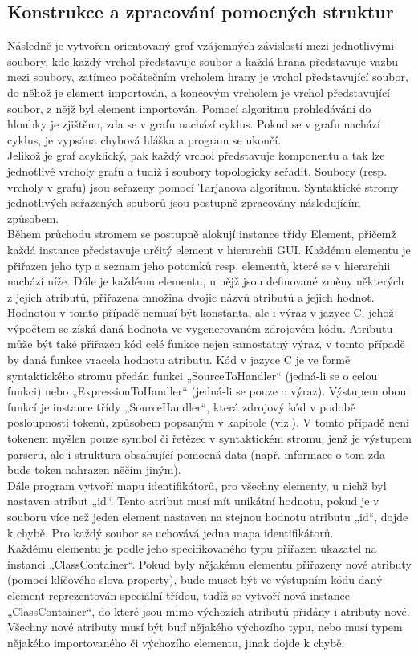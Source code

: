 \documentclass[report,11pt]{elsarticle}
\begin{document}
\subsection{\label{SEC:Intro}Konstrukce a zpracování pomocných struktur}
Následně je vytvořen orientovaný graf vzájemných závislostí mezi jednotlivými soubory, kde každý vrchol představuje soubor a každá hrana představuje vazbu mezi soubory, zatímco počátečním vrcholem hrany je vrchol představující soubor, do něhož je element importován, a koncovým vrcholem je vrchol představující soubor, z nějž byl element importován. Pomocí algoritmu prohledávání do hloubky je zjištěno, zda se v grafu nachází cyklus. Pokud se v grafu nachází cyklus, je vypsána chybová hláška a program se ukončí.\\
Jelikož je graf acyklický, pak každý vrchol představuje komponentu a tak lze jednotlivé vrcholy grafu a tudíž i soubory topologicky seřadit. Soubory (resp. vrcholy v grafu) jsou seřazeny pomocí Tarjanova algoritmu. Syntaktické stromy jednotlivých seřazených souborů jsou postupně zpracovány následujícím způsobem.\\
Během průchodu stromem se postupně alokují instance třídy Element, přičemž každá instance představuje určitý element v hierarchii GUI. Každému elementu je přiřazen jeho typ a seznam jeho potomků resp. elementů, které se v hierarchii nachází níže. Dále je každému elementu, u nějž jsou definované změny některých z jejich atributů, přiřazena množina dvojic názvů atributů a jejich hodnot. Hodnotou v tomto případě nemusí být konstanta, ale i výraz v jazyce C, jehož výpočtem se získá daná hodnota ve vygenerovaném zdrojovém kódu. Atributu může být také přiřazen kód celé funkce nejen samostatný výraz, v tomto případě by daná funkce vracela hodnotu atributu. Kód v jazyce C je ve formě syntaktického stromu předán funkci „SourceToHandler“ (jedná-li se o celou funkci) nebo „ExpressionToHandler“ (jedná-li se pouze o výraz). Výstupem obou funkcí je instance třídy „SourceHandler“, která zdrojový kód v podobě posloupnosti tokenů, způsobem popsaným v kapitole (viz.). V tomto případě není tokenem myšlen pouze symbol či řetězec v syntaktickém stromu, jenž je výstupem parseru, ale i struktura obsahující pomocná data (např. informace o tom zda bude token nahrazen něčím jiným).\\
Dále program vytvoří mapu identifikátorů, pro všechny elementy, u nichž byl nastaven atribut „id“. Tento atribut musí mít unikátní hodnotu, pokud je v souboru více než jeden element nastaven na stejnou hodnotu atributu „id“, dojde k chybě. Pro každý soubor se uchovává jedna mapa identifikátorů.\\
Každému elementu je podle jeho specifikovaného typu přiřazen ukazatel na instanci „ClassContainer“. Pokud byly nějakému elementu přiřazeny nové atributy (pomocí klíčového slova property), bude muset být ve výstupním kódu daný element reprezentován speciální třídou, tudíž se vytvoří nová instance „ClassContainer“, do které jsou mimo výchozích atributů přidány i atributy nové. Všechny nové atributy musí být buď nějakého výchozího typu, nebo musí typem nějakého importovaného či výchozího elementu, jinak dojde k chybě.
\end{document}
